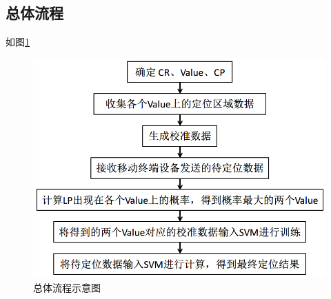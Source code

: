 \documentclass[a4paper, UTF8, twocolumn ]{ctexart}
\begin{document}
\subsection{总体流程}
如图\ref{fig:no11}
\begin{figure}[!ht]\centering
  \includegraphics[keepaspectratio, scale=0.3]{no11.png}
  \caption{总体流程示意图\label{fig:no11}} 
\end{figure}
\end{document}
